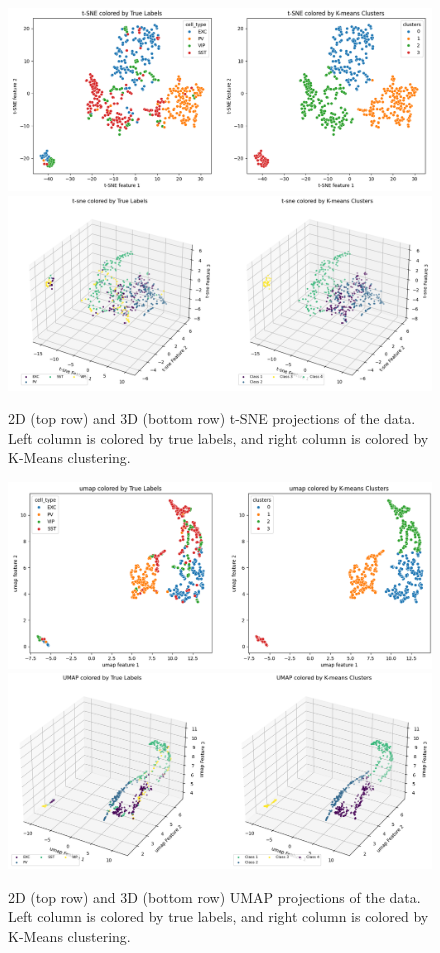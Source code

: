 \documentclass{IEEEtran}
\begin{document}
\begin{figure}[h!]
  \centering
  \includegraphics[width=1\columnwidth]{figures/Compare t-SNE 2D.png}
  \includegraphics[width=1\columnwidth]{figures/Compare t-SNE 3D.png}
  \caption{2D (top row) and 3D (bottom row) t-SNE projections of the data. Left column is colored by true labels, and right column is colored by K-Means clustering.}%
  \label{fig:t-SNE}
\end{figure}

\begin{figure}[h!]
  \centering
  \includegraphics[width=1\columnwidth]{figures/Compare UMAP 2D.png}
  \includegraphics[width=1\columnwidth]{figures/Compare UMAP 3D.png}
  \caption{2D (top row) and 3D (bottom row) UMAP projections of the data. Left column is colored by true labels, and right column is colored by K-Means clustering.}%
  \label{fig:umap}
\end{figure}
\end{document}
